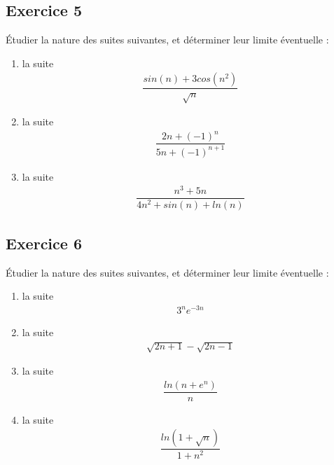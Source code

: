 \documentclass[letterpaper,10pt,french]{jupyterBook}
\begin{document}
\subsection{Exercice 5}
\label{\detokenize{exo2:exercice-5}}
\sphinxAtStartPar
Étudier la nature des suites suivantes, et déterminer leur limite éventuelle :
\begin{enumerate}
%
\item {} 
\sphinxAtStartPar
la suite
\begin{equation*}
\begin{split}
    \dfrac{sin(n) + 3cos(n^2)}{\sqrt{n}}
    \end{split}
\end{equation*}
\item {} 
\sphinxAtStartPar
la suite
\begin{equation*}
\begin{split}
    \dfrac{2n + (-1)^n}{5n + (-1)^{n+1}}
    \end{split}
\end{equation*}
\item {} 
\sphinxAtStartPar
la suite
\begin{equation*}
\begin{split}
    \dfrac{n^3 + 5n}{4n^2 + sin(n) + ln(n)}
    \end{split}
\end{equation*}
\end{enumerate}


\subsection{Exercice 6}
\label{\detokenize{exo2:exercice-6}}
\sphinxAtStartPar
Étudier la nature des suites suivantes, et déterminer leur limite éventuelle :
\begin{enumerate}
%
\item {} 
\sphinxAtStartPar
la suite
\begin{equation*}
\begin{split}
    3^n e^{-3n}
    \end{split}
\end{equation*}
\item {} 
\sphinxAtStartPar
la suite
\begin{equation*}
\begin{split}
    \sqrt{2n+1} - \sqrt{2n-1}
    \end{split}
\end{equation*}
\item {} 
\sphinxAtStartPar
la suite
\begin{equation*}
\begin{split}
    \dfrac{ln(n+e^n)}{n}
    \end{split}
\end{equation*}
\item {} 
\sphinxAtStartPar
la suite
\begin{equation*}
\begin{split}
    \dfrac{ln(1+\sqrt{n})}{1+n^2}
    \end{split}
\end{equation*}
\end{enumerate}
\end{document}
